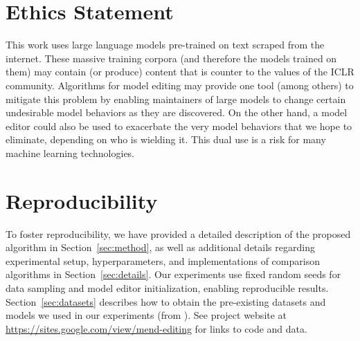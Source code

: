\documentclass{article}
\begin{document}
\newpage


\section*{Ethics Statement}
This work uses large language models pre-trained on text scraped from the internet. These massive training corpora (and therefore the models trained on them) may contain (or produce) content that is counter to the values of the ICLR community. Algorithms for model editing may provide one tool (among others) to mitigate this problem by enabling maintainers of large models to change certain undesirable model behaviors as they are discovered. On the other hand, a model editor could also be used to exacerbate the very model behaviors that we hope to eliminate, depending on who is wielding it. This dual use is a risk for many machine learning technologies. 

\section*{Reproducibility}
To foster reproducibility, we have provided a detailed description of the proposed algorithm in Section~\ref{sec:method}, as well as additional details regarding experimental setup, hyperparameters, and implementations of comparison algorithms in Section~\ref{sec:details}. Our experiments use fixed random seeds for data sampling and model editor initialization, enabling reproducible results. Section~\ref{sec:datasets} describes how to obtain the pre-existing datasets and models we used in our experiments (from \cite{Cao2021EditingFK}). See project website at \href{https://sites.google.com/view/mend-editing}{https://sites.google.com/view/mend-editing} for links to code and data.

\newpage


\newpage

\appendix

\begin{appendix}

\end{appendix}
\end{document}
